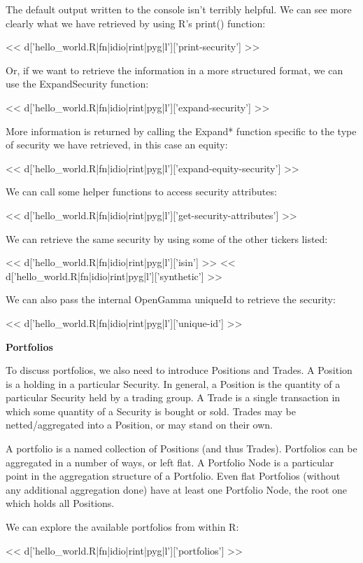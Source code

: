 \documentclass[custom, plainsections]{sciposter}
\begin{document}
\begin{multicols*}{2}
The default output written to the console isn't terribly helpful. We can see more clearly what we have retrieved by using R's print() function:

<< d['hello_world.R|fn|idio|rint|pyg|l']['print-security'] >>

Or, if we want to retrieve the information in a more structured format, we can use the ExpandSecurity function:

<< d['hello_world.R|fn|idio|rint|pyg|l']['expand-security'] >>

More information is returned by calling the Expand* function specific to the type of security we have retrieved, in this case an equity:

<< d['hello_world.R|fn|idio|rint|pyg|l']['expand-equity-security'] >>

We can call some helper functions to access security attributes:

<< d['hello_world.R|fn|idio|rint|pyg|l']['get-security-attributes'] >>

We can retrieve the same security by using some of the other tickers listed:

<< d['hello_world.R|fn|idio|rint|pyg|l']['isin'] >>
<< d['hello_world.R|fn|idio|rint|pyg|l']['synthetic'] >>

We can also pass the internal OpenGamma uniqueId to retrieve the security:

<< d['hello_world.R|fn|idio|rint|pyg|l']['unique-id'] >>

\vspace{0.5cm}

\textbf{Portfolios}

To discuss portfolios, we also need to introduce Positions and Trades. A Position is a holding in a particular Security. In general, a Position is the quantity of a particular Security held by a trading group. A Trade is a single transaction in which some quantity of a Security is bought or sold. Trades may be netted/aggregated into a Position, or may stand on their own.

A portfolio is a named collection of Positions (and thus Trades). Portfolios can be aggregated in a number of ways, or left flat. A Portfolio Node is a particular point in the aggregation structure of a Portfolio. Even flat Portfolios (without any additional aggregation done) have at least one Portfolio Node, the root one which holds all Positions.

We can explore the available portfolios from within R:

<< d['hello_world.R|fn|idio|rint|pyg|l']['portfolios'] >>


\end{multicols*}
\end{document}
